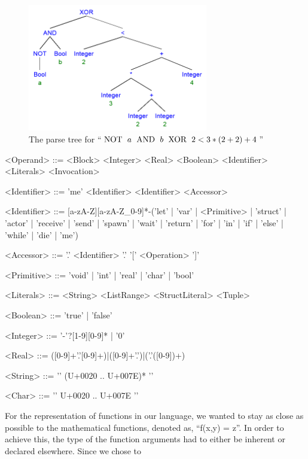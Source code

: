 \begin{figure}[htbp]
\centering
\includegraphics[width=0.7\textwidth]{Design/Expressions/precidenceExamples.png}
\caption{The parse tree for \textnormal{\enquote{$\text{NOT \;} a \text{\; AND \;} b \text{\; XOR \;} 2 < 3 * (2 + 2) + 4$}}} %
\label{precidenceExamples}
\end{figure}

\begin{grammar}
<Operand>	::= <Block>
 \alt <Integer>
 \alt <Real>
 \alt <Boolean>
 \alt <Identifier>
 \alt <Literals>
 \alt <Invocation>

<Identifier> ::= 'me'
 \alt <Identifier>
 \alt <Identifier> <Accessor>
											
<Identifier> ::= [a-zA-Z][a-zA-Z\_0-9]*-('let' | 'var' | <Primitive> | 'struct' | 'actor' | 'receive' | 'send' | 'spawn' | 'wait' | 'return' | 'for' | 'in' | 'if' | 'else' | 'while' | 'die' | 'me')

<Accessor> ::= '.' <Identifier>
 \alt '.' '[' <Operation> ']'

<Primitive> ::= 'void' | 'int' | 'real' | 'char' | 'bool'

<Literals> ::= <String>
 \alt <ListRange>
 \alt <StructLiteral>
 \alt <Tuple>

<Boolean> ::= 'true' | 'false'

<Integer> ::= '-'?[1-9][0-9]* | '0'

<Real> ::= ([0-9]+'.'[0-9]+)|([0-9]+'.')|('.'([0-9])+)

<String> ::= '\textquotedbl' (U+0020 .. U+007E)* '\textquotedbl'

<Char> ::= '\textquotesingle' U+0020 .. U+007E '\textquotesingle'
\end{grammar}

For the representation of functions in our language, we wanted to stay as close as possible to the mathematical functions, denoted as, \enquote{f(x,y) = z}. In order to achieve this, the type of the function arguments had to either be inherent or declared elsewhere. Since we chose to 

